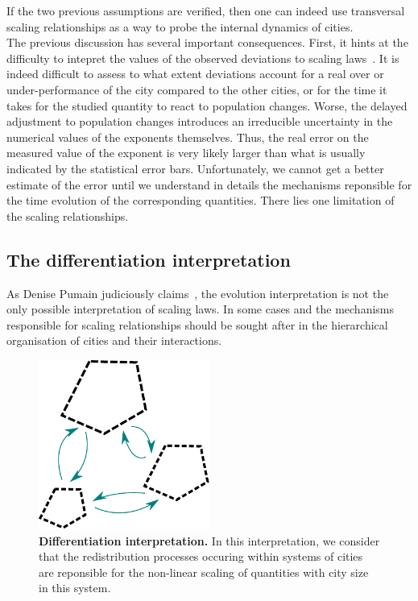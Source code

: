 If the two previous assumptions are verified, then one can indeed use
transversal scaling relationships as a way to probe the internal dynamics of
cities.\\

The previous discussion has several important consequences. First, it hints at
the difficulty to intepret the values of the observed deviations to scaling
laws~\cite{Bettencourt:2010a}. It is indeed difficult to assess to what extent
deviations account for a real over or under-performance of the city compared to
the other cities, or for the time it takes for the studied quantity to react to
population changes.  Worse, the delayed adjustment to population changes
introduces an irreducible uncertainty in the numerical values of the exponents
themselves. Thus, the real error on the measured value of the exponent is very
likely larger than what is usually indicated by the statistical error bars.
Unfortunately, we cannot get a better estimate of the error until we understand
in details the mechanisms reponsible for the time evolution of the corresponding
quantities. There lies one limitation of the scaling relationships.

\subsection{The differentiation interpretation}
\label{sub:the_differentiation_interpretation}

As Denise Pumain judiciously claims~\cite{Pumain:2006,Pumain:2012}, the evolution
interpretation is not the only possible interpretation of scaling laws. In some
cases and the mechanisms responsible for scaling relationships should be sought
after in the hierarchical organisation of cities and their interactions.\\

\begin{figure}[!h]
    \centering
    \includegraphics[width=0.5\textwidth]{gfx/chapter-scaling/system-interpretation.pdf}
    \caption{{\bf Differentiation interpretation.} In this interpretation, we
    consider that the redistribution processes occuring within systems of cities
are reponsible for the non-linear scaling of quantities with city size in this
system.\label{fig:label_fig}}
\end{figure}

